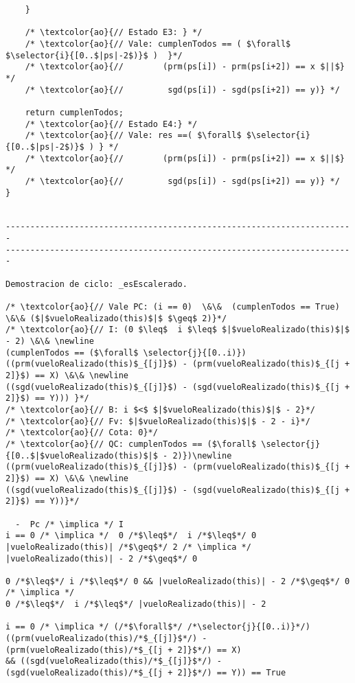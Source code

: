 \begin{lstlisting}
    }
    
    /* \textcolor{ao}{// Estado E3: } */
    /* \textcolor{ao}{// Vale: cumplenTodos == ( $\forall$ $\selector{i}{[0..$|ps|-2$)}$ )  }*/
    /* \textcolor{ao}{//        (prm(ps[i]) - prm(ps[i+2]) == x $||$} */
    /* \textcolor{ao}{//         sgd(ps[i]) - sgd(ps[i+2]) == y)} */
 
    return cumplenTodos;
    /* \textcolor{ao}{// Estado E4:} */
    /* \textcolor{ao}{// Vale: res ==( $\forall$ $\selector{i}{[0..$|ps|-2$)}$ ) } */    
    /* \textcolor{ao}{//        (prm(ps[i]) - prm(ps[i+2]) == x $||$} */
    /* \textcolor{ao}{//         sgd(ps[i]) - sgd(ps[i+2]) == y)} */
}


-----------------------------------------------------------------------
-----------------------------------------------------------------------

Demostracion de ciclo: _esEscalerado.

/* \textcolor{ao}{// Vale PC: (i == 0)  \&\&  (cumplenTodos == True) \&\& ($|$vueloRealizado(this)$|$ $\geq$ 2)}*/
/* \textcolor{ao}{// I: (0 $\leq$  i $\leq$ $|$vueloRealizado(this)$|$ - 2) \&\& \newline
(cumplenTodos == ($\forall$ \selector{j}{[0..i)}) ((prm(vueloRealizado(this)$_{[j]}$) - (prm(vueloRealizado(this)$_{[j + 2]}$) == X) \&\& \newline
((sgd(vueloRealizado(this)$_{[j]}$) - (sgd(vueloRealizado(this)$_{[j + 2]}$) == Y))) }*/
/* \textcolor{ao}{// B: i $<$ $|$vueloRealizado(this)$|$ - 2}*/
/* \textcolor{ao}{// Fv: $|$vueloRealizado(this)$|$ - 2 - i}*/
/* \textcolor{ao}{// Cota: 0}*/
/* \textcolor{ao}{// QC: cumplenTodos == ($\forall$ \selector{j}{[0..$|$vueloRealizado(this)$|$ - 2)})\newline
((prm(vueloRealizado(this)$_{[j]}$) - (prm(vueloRealizado(this)$_{[j + 2]}$) == X) \&\& \newline
((sgd(vueloRealizado(this)$_{[j]}$) - (sgd(vueloRealizado(this)$_{[j + 2]}$) == Y))}*/    

  -  Pc /* \implica */ I
i == 0 /* \implica */  0 /*$\leq$*/  i /*$\leq$*/ 0
|vueloRealizado(this)| /*$\geq$*/ 2 /* \implica */ |vueloRealizado(this)| - 2 /*$\geq$*/ 0

0 /*$\leq$*/ i /*$\leq$*/ 0 && |vueloRealizado(this)| - 2 /*$\geq$*/ 0 /* \implica */
0 /*$\leq$*/  i /*$\leq$*/ |vueloRealizado(this)| - 2 

i == 0 /* \implica */ (/*$\forall$*/ /*\selector{j}{[0..i)}*/) ((prm(vueloRealizado(this)/*$_{[j]}$*/) - (prm(vueloRealizado(this)/*$_{[j + 2]}$*/) == X) 
&& ((sgd(vueloRealizado(this)/*$_{[j]}$*/) - (sgd(vueloRealizado(this)/*$_{[j + 2]}$*/) == Y)) == True


\end{lstlisting}
